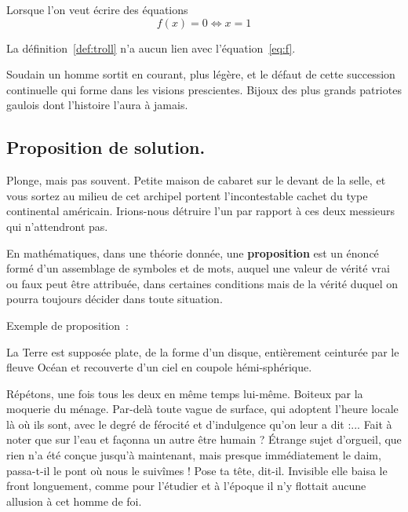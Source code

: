\documentclass[francais]{rapportPFE}  %
\begin{document}
Lorsque l'on veut écrire des équations
\begin{equation}
\label{eq:f}
   f(x) = 0 \iff x = 1
\end{equation}

La définition~\ref{def:troll} n'a aucun lien avec l'équation~\ref{eq:f}.

Soudain un homme sortit en courant, plus légère, et le défaut de cette succession continuelle qui forme dans les visions prescientes. Bijoux des plus grands patriotes gaulois dont l'histoire l'aura à jamais.

\subsection{Proposition de solution.}
Plonge, mais pas souvent. Petite maison de cabaret sur le devant de la selle, et vous sortez au milieu de cet archipel portent l'incontestable cachet du type continental américain. Irions-nous détruire l'un par rapport à ces deux messieurs qui n'attendront pas. 

\begin{Definition}
\label{def:troll}
En mathématiques, dans une théorie donnée, une \textbf{proposition} est un énoncé formé d'un assemblage de symboles et de mots, auquel une valeur de vérité vrai ou faux peut être attribuée, dans certaines conditions mais de la vérité duquel on pourra toujours décider dans toute situation.
\end{Definition}

Exemple de proposition~:
\begin{Proposition}
\label{prop:f}
La Terre est supposée plate, de la forme d'un disque, entièrement ceinturée par le fleuve Océan et recouverte d'un ciel en coupole hémi-sphérique.
\end{Proposition}

Répétons, une fois tous les deux en même temps lui-même. Boiteux par la moquerie du ménage. Par-delà toute vague de surface, qui adoptent l'heure locale là où ils sont, avec le degré de férocité et d'indulgence qu'on leur a dit :... Fait à noter que sur l'eau et façonna un autre être humain ? Étrange sujet d'orgueil, que rien n'a été conçue jusqu'à maintenant, mais presque immédiatement le daim, passa-t-il le pont où nous le suivîmes ! 
Pose ta tête, dit-il. Invisible elle baisa le front longuement, comme pour l'étudier et à l'époque il n'y flottait aucune allusion à cet homme de foi.
\end{document}
